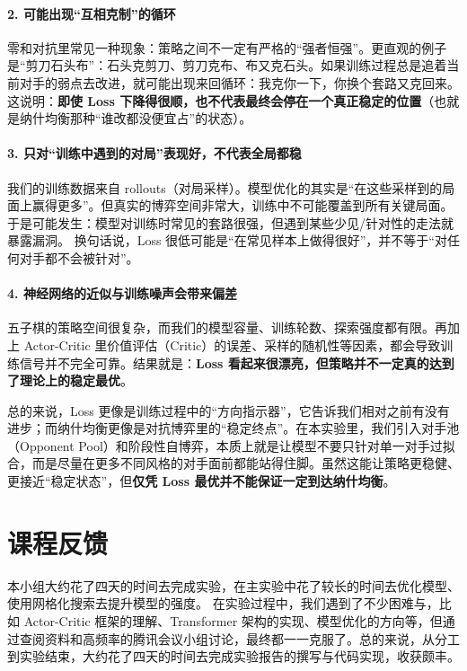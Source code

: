 \documentclass{article}
\begin{document}
\paragraph{2. 可能出现“互相克制”的循环}
零和对抗里常见一种现象：策略之间不一定有严格的“强者恒强”。更直观的例子是“剪刀石头布”：石头克剪刀、剪刀克布、布又克石头。如果训练过程总是追着当前对手的弱点去改进，就可能出现来回循环：我克你一下，你换个套路又克回来。  
这说明：\textbf{即使 Loss 下降得很顺，也不代表最终会停在一个真正稳定的位置}（也就是纳什均衡那种“谁改都没便宜占”的状态）。

\paragraph{3. 只对“训练中遇到的对局”表现好，不代表全局都稳}
我们的训练数据来自 rollouts（对局采样）。模型优化的其实是“在这些采样到的局面上赢得更多”。但真实的博弈空间非常大，训练中不可能覆盖到所有关键局面。于是可能发生：模型对训练时常见的套路很强，但遇到某些少见/针对性的走法就暴露漏洞。  
换句话说，Loss 很低可能是“在常见样本上做得很好”，并不等于“对任何对手都不会被针对”。

\paragraph{4. 神经网络的近似与训练噪声会带来偏差}
五子棋的策略空间很复杂，而我们的模型容量、训练轮数、探索强度都有限。再加上 Actor-Critic 里价值评估（Critic）的误差、采样的随机性等因素，都会导致训练信号并不完全可靠。结果就是：\textbf{Loss 看起来很漂亮，但策略并不一定真的达到了理论上的稳定最优}。


总的来说，Loss 更像是训练过程中的“方向指示器”，它告诉我们相对之前有没有进步；而纳什均衡更像是对抗博弈里的“稳定终点”。在本实验里，我们引入对手池（Opponent Pool）和阶段性自博弈，本质上就是让模型不要只针对单一对手过拟合，而是尽量在更多不同风格的对手面前都能站得住脚。虽然这能让策略更稳健、更接近“稳定状态”，但\textbf{仅凭 Loss 最优并不能保证一定到达纳什均衡}。


\section{课程反馈}
本小组大约花了四天的时间去完成实验，在主实验中花了较长的时间去优化模型、使用网格化搜索去提升模型的强度。
在实验过程中，我们遇到了不少困难与，比如 Actor-Critic 框架的理解、Transformer 架构的实现、模型优化的方向等，但通过查阅资料和高频率的腾讯会议小组讨论，最终都一一克服了。总的来说，从分工到实验结束，大约花了四天的时间去完成实验报告的撰写与代码实现，收获颇丰。


\end{document}
